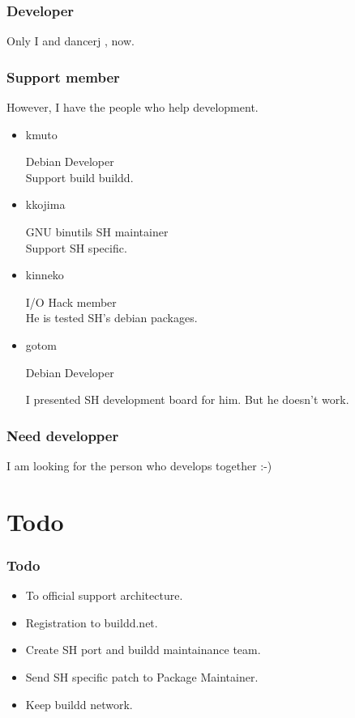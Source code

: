 \documentclass[cjk,dvipdfm,12pt]{beamer}
\begin{document}
\begin{frame}
 \frametitle{Developer}
  Only I and dancerj , now.
 
\end{frame}

\begin{frame}
 \frametitle{Support member}
  However, I have the people who help development. 
 \begin{itemize}
  \item kmuto

	Debian Developer \\
	Support build buildd.

  \item kkojima

	GNU binutils SH maintainer \\
	Support SH specific.

  \item kinneko

	I/O Hack member\\
	He is tested SH's debian packages.	

  \item gotom
 
 	Debian Developer

	I presented SH development board for him. But he doesn't work.

%
	
	
 \end{itemize}
\end{frame}


\begin{frame}
 \frametitle{Need developper}
 I am looking for the person who develops together :-)

\end{frame}


\section{Todo}
\begin{frame}
 \frametitle{Todo}

   \begin{itemize}
    \item To official support architecture.
    \item Registration to buildd.net.
    \item Create SH port and buildd maintainance team.
    \item Send SH specific patch to Package Maintainer.
    \item Keep buildd network.
   \end{itemize}
\end{frame}
\end{document}

